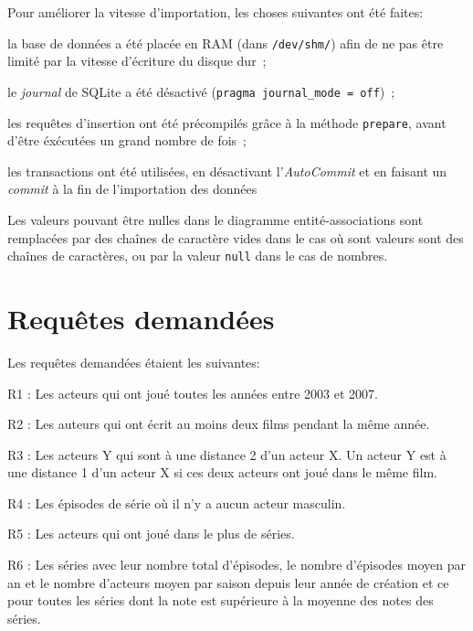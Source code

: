 \documentclass[a4paper,12pt]{article}
\begin{document}
Pour améliorer la vitesse d'importation, les choses suivantes ont été faites:
\begin{list}{-}{}
  \item la base de données a été placée en RAM (dans
    \texttt{/dev/shm/}) afin de ne pas être limité par la vitesse
    d'écriture du disque dur~;
  \item le \emph{journal} de SQLite a été désactivé (\texttt{pragma
    journal\_mode = off})~;
  \item les requêtes d'insertion ont été précompilés grâce à la
    méthode \texttt{prepare}, avant d'être éxécutées un grand nombre de fois~;
  \item les transactions ont été utilisées, en désactivant
    l'\emph{AutoCommit} et en faisant un \emph{commit} à la fin de
    l'importation des données
\end{list}

Les valeurs pouvant être nulles dans le diagramme entité-associations
sont remplacées par des chaînes de caractère vides dans le cas où sont
valeurs sont des chaînes de caractères, ou par la valeur \texttt{null}
dans le cas de nombres.
\section{Requêtes demandées}
Les requêtes demandées étaient les suivantes:
\begin{list}{-}{}
  \item R1 : Les acteurs qui ont joué toutes les années entre 2003 et
    2007.
  \item R2 : Les auteurs qui ont écrit au moins deux films pendant la
    même année.
  \item R3 : Les acteurs Y qui sont à une distance 2 d'un acteur X. Un
    acteur Y est à une distance 1 d'un acteur X si ces deux acteurs
    ont joué dans le même film.
  \item R4 : Les épisodes de série où il n'y a aucun acteur masculin.
  \item R5 : Les acteurs qui ont joué dans le plus de séries.
  \item R6 : Les séries avec leur nombre total d'épisodes, le nombre
    d'épisodes moyen par an et le nombre d'acteurs moyen par saison
    depuis leur année de création et ce pour toutes les séries dont la
    note est supérieure à la moyenne des notes des séries.
\end{list}
\end{document}
